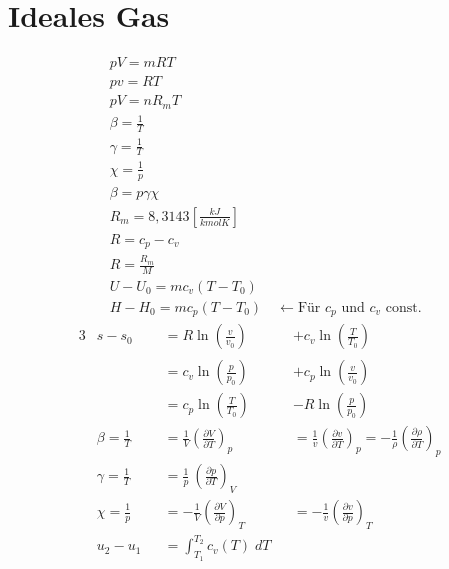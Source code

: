 \documentclass[twocolumn]{article}
\begin{document}
                                                        
\section{Ideales Gas}
\setlength{\belowdisplayskip}{-10pt} \setlength{\belowdisplayshortskip}{-10pt}

\begin{align*}
	&pV = mRT \\ 
	&pv = RT \\
	&pV = nR_mT \\
	&\beta = \frac{1}{T} \\
	&\gamma = \frac{1}{T} \\
	&\chi = \frac{1}{p} \\
	&\beta = p \gamma \chi\\
	&R_m = 8,3143\left[\frac{kJ}{kmolK}\right] \\
	&R = c_p - c_v\\
	&R = \frac{R_m}{M}
	\\
	&U - U_0 = mc_v(T-T_0)
	\\
	&H - H_0 = mc_p(T-T_0) \quad \leftarrow \text{Für $c_p$ und $c_v$ const.}
\end{align*}
\begin{alignat*}{3}
	&s - s_0 
	&&= R \ln \left(\frac{ v}{ v_0}\right)_{} 
	&&+ c_v \ln \left(\frac{ T}{ T_0}\right)_{}
	\\
	& 
	&&= c_v \ln \left( \frac{p}{p_0} \right) 
	&&+ c_p \ln \left( \frac{v}{v_0} \right)
	\\
	& 
	&&= c_p \ln \left( \frac{T}{T_0} \right) 
	&&-R \ln \left( \frac{p}{p_0} \right)
	\\
	&\beta 
	= \frac{1}{T} 
	&&=\frac{1}{V}\left(\frac{\partial V}{\partial T}\right)_{p} 
	&&=  \frac{1}{v}\left(\frac{\partial v}{\partial T}\right)_{p} 
	=  - \frac{1}{\rho}\left(\frac{\partial \rho}{\partial T}\right)_{p} 
	\\
	&\gamma 
	= \frac{1}{T}  
	&&= \frac{1}{p} \: \left(\frac{\partial p}{\partial T}\right)_{V}
	\\
	&\chi 
	= \frac{1}{p} 
	&&= - \frac{1}{V}\left(\frac{\partial V}{\partial p}\right)_{T}  
	&&= - \frac{1}{v}\left(\frac{\partial v}{\partial p}\right)_{T}
	\\
		& u_2 - u_1 &&= \int_{T_1}^{T_2} c_v(T)\; dT
	\\
\end{alignat*}
                                                                          
\end{document}
